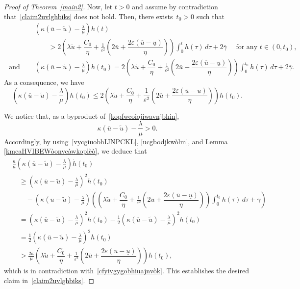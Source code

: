 \documentclass[12pt,a4paper,intlimits,sumlimits]{amsart}
\theoremstyle{definition}
\theoremstyle{plain}
\numberwithin{equation}{section}
\renewcommand{\le}{\leqslant}
\renewcommand{\ge}{\geqslant}
\begin{document}
\begin{proof}[Proof of Theorem~\ref{main2}]
Now, let $t>0$ and assume by contradiction that~\eqref{claim2uvlghbiks} does not hold. Then, there exists~$t_0>0$ such that
\begin{equation}\label{ucgbodjkwòlm}\begin{split}
& \left(\kappa(\overline{u}-\widetilde u)-\frac{\lambda}{\mu}\right)h(t)\\
&\qquad>2\left(\lambda\widetilde u +\dfrac{C_0}{\eta}+\frac{1}{\varepsilon^2}\left(2\overline u +\dfrac{2\varepsilon(\overline u -\underline u)}{\eta} \right)\right)\int_0^t h(\tau)\,d\tau +2\overline\gamma\quad\mbox{ for any } t\in (0, t_0),\\
\mbox{ and } \quad
&\left(\kappa(\overline{u}-\widetilde u)-\frac{\lambda}{\mu}\right)h(t_0)=2\left(\lambda\widetilde u +\dfrac{C_0}{\eta}+\frac{1}{\varepsilon^2}\left(2\overline u +\dfrac{2\varepsilon(\overline u -\underline u)}{\eta} \right)\right)\int_0^{t_0} h(\tau)\,d\tau +2\overline\gamma .
\end{split}\end{equation}
As a consequence, we have
\begin{equation}\label{cfyivgygobhiuajnvòk}
\left(\kappa(\overline{u}-\widetilde u)-\frac{\lambda}{\mu}\right)\dot h(t_0)\le 2\left(\lambda\widetilde u +\dfrac{C_0}{\eta}+\frac{1}{\varepsilon^2}\left(2\overline u +\dfrac{2\varepsilon(\overline u -\underline u)}{\eta} \right)\right) h(t_0).
\end{equation}

We notice that,  as a byproduct of~\eqref{kopfweoiojiwavnjbhin}, 
\begin{equation}\label{bdwipKMEJFà-}
\kappa(\overline{u}-\widetilde u)-\frac{\lambda}{\mu}>0.
\end{equation}
Accordingly, by using~\eqref{vycgiuobhIJNPCKL}, \eqref{ucgbodjkwòlm},  and Lemma \ref{kmcaHVIBEWòonvcàwkoplèò}, we deduce that
\[
\begin{split}
&\frac{\kappa}{\mu}\left(\kappa(\overline{u}-\widetilde u)-\frac{\lambda}{\mu}\right)\dot h(t_0)\\
&\quad\ge \left(\kappa(\overline{u}-\widetilde u)-\frac{\lambda}{\mu}\right)^2 h(t_0)\\
&\qquad-\left(\kappa(\overline{u}-\widetilde u)-\frac{\lambda}{\mu}\right)\left(\left(\lambda\widetilde u +\dfrac{C_0}{\eta}+\frac{1}{\varepsilon^2}\left(2\overline u +\dfrac{2\varepsilon(\overline u -\underline u)}{\eta} \right)\right)\int_0^{t_0} h(\tau)\,d\tau+\overline\gamma\right)\\
&\quad=\left(\kappa(\overline{u}-\widetilde u)-\frac{\lambda}{\mu}\right)^2 h(t_0)-\frac12\left(\kappa(\overline{u}-\widetilde u)-\frac{\lambda}{\mu}\right)^2 h(t_0)\\
&\quad=\frac12\left(\kappa(\overline{u}-\widetilde u)-\frac{\lambda}{\mu}\right)^2 h(t_0)\\
&\quad >\frac{2\kappa}{\mu}\left(\lambda\widetilde u +\dfrac{C_0}{\eta}+\frac{1}{\varepsilon^2}\left(2\overline u +\dfrac{2\varepsilon(\overline u -\underline u)}{\eta} \right)\right) h(t_0),
\end{split}
\]
which is in contradiction with~\eqref{cfyivgygobhiuajnvòk}. This establishes the desired claim in~\eqref{claim2uvlghbiks}.


\end{proof}
\end{document}
